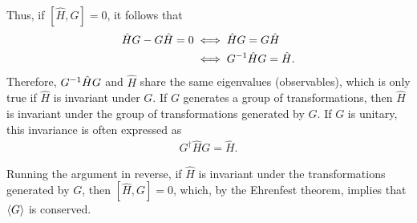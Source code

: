     Thus, if $[\hat{H},G]=0$, it follows that
    \begin{align*}
        \hat{H}G-G\hat{H} = 0
            &\iff \hat{H}G = G\hat{H} \\
            &\iff { G }^{-1}\hat{H}G = \hat{H}.
    \end{align*}
    Therefore, ${ G }^{-1}\hat{H}G$ and $\hat{H}$ share the same eigenvalues (observables), which is only true if $\hat{H}$ is invariant under $G$.
    If $G$ generates a group of transformations, then $\hat{H}$ is invariant under the group of transformations generated by $G$. If $G$ is unitary, this invariance is often expressed as 
    \begin{align*}
        G^\dagger\hat{H}G = \hat{H}.
    \end{align*}
    
    
    Running the argument in reverse, if $\hat{H}$ is invariant under the transformations generated by $G$, then $[\hat{H},G]=0$, which, by the Ehrenfest theorem, implies that $\braket{G}$ is conserved.